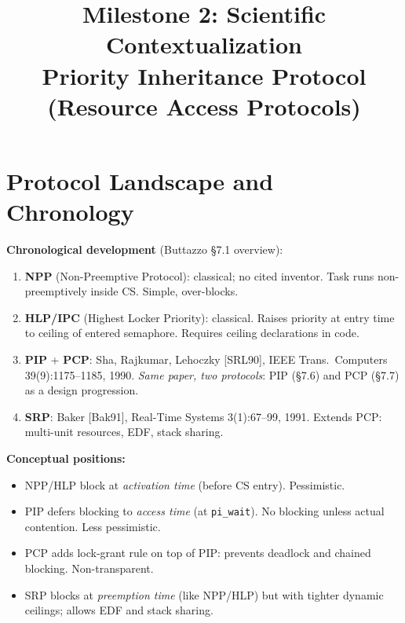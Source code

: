 \documentclass[conference,onecolumn]{IEEEtran}
\begin{document}
\title{Milestone 2: Scientific Contextualization\\
  {\large Priority Inheritance Protocol (Resource Access Protocols)}}

\author{
}

\maketitle

\section{Protocol Landscape and Chronology}

\textbf{Chronological development} (Buttazzo \S7.1 overview):
\begin{enumerate}
  \item \textbf{NPP} (Non-Preemptive Protocol): classical; no cited inventor.
        Task runs non-preemptively inside CS. Simple, over-blocks.
  \item \textbf{HLP/IPC} (Highest Locker Priority): classical.
        Raises priority at entry time to ceiling of entered semaphore.
        Requires ceiling declarations in code.
  \item \textbf{PIP} + \textbf{PCP}: Sha, Rajkumar, Lehoczky [SRL90],
        IEEE Trans.\ Computers 39(9):1175--1185, 1990.
        \emph{Same paper, two protocols}: PIP (§7.6) and PCP (§7.7)
        as a design progression.
  \item \textbf{SRP}: Baker [Bak91], Real-Time Systems 3(1):67--99, 1991.
        Extends PCP: multi-unit resources, EDF, stack sharing.
\end{enumerate}

\textbf{Conceptual positions:}
\begin{itemize}
  \item NPP/HLP block at \emph{activation time} (before CS entry). Pessimistic.
  \item PIP defers blocking to \emph{access time} (at \texttt{pi\_wait}).
        No blocking unless actual contention. Less pessimistic.
  \item PCP adds lock-grant rule on top of PIP:
        prevents deadlock and chained blocking. Non-transparent.
  \item SRP blocks at \emph{preemption time} (like NPP/HLP) but with
        tighter dynamic ceilings; allows EDF and stack sharing.
\end{itemize}
\end{document}
